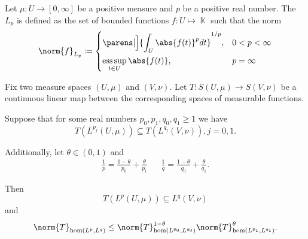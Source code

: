 \begin{definition}\label{def:lebesgue_space}\cite[6]{BerghLofstrom1976}
  Let \( \mu: U \to [0, \infty] \) be a positive measure and \( p \) be a positive real number. The  \( L_p \) is defined as the set of bounded functions \( f: U \mapsto \BbbK \) such that the norm
  \begin{equation*}
    \norm{f}_{L_p} \coloneqq \begin{dcases}
      \parens[\Big]{\int_U \abs{f(t)}^p dt}^{1/p}, &0 < p < \infty \\
      \ess\sup_{t \in U} \abs{f(t)} , &p = \infty
    \end{dcases}
  \end{equation*}
\end{definition}

\begin{theorem}\label{thm:riesz_thorin}
  Fix two measure spaces \( (U, \mu) \) and \( (V, \nu) \). Let \( T: S(U, \mu) \to S(V, \nu) \) be a continuous linear map between the corresponding spaces of measurable functions.

  Suppose that for some real numbers \( p_0, p_1, q_0, q_1 \geq 1 \) we have
  \begin{equation*}
    T(L^{p_j}(U, \mu)) \subseteq T(L^{q_j}(V, \nu)), j = 0, 1.
  \end{equation*}

  Additionally, let \( \theta \in (0, 1) \) and
  \begin{align*}
    \frac 1 p = \frac {1 - \theta} {p_0} + \frac {\theta} {p_1}
    &&
    \frac 1 q = \frac {1 - \theta} {q_0} + \frac {\theta} {q_1}.
  \end{align*}

  Then
  \begin{equation*}
    T(L^p(U, \mu)) \subseteq L^q(V, \nu)
  \end{equation*}
  and
  \begin{equation*}
    \norm{T}_{\hom(L^p, L^q)} \leq \norm{T}_{\hom(L^{p_0}, L^{q_0})}^{1 - \theta} \norm{T}_{\hom(L^{p_1}, L^{q_1})}^\theta.
  \end{equation*}
\end{theorem}

